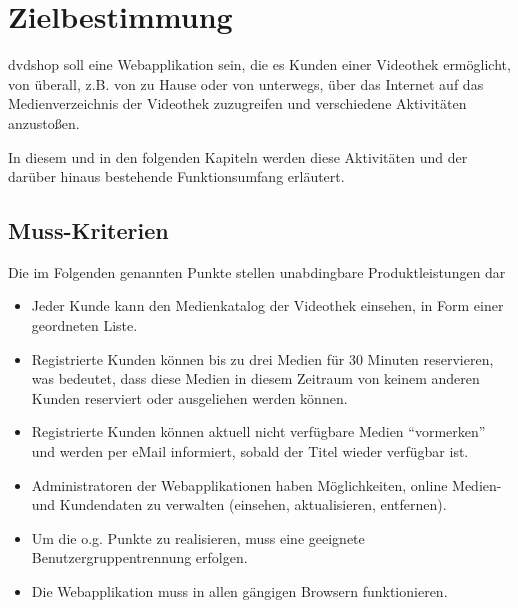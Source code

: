 \documentclass[12pt,oneside,a4paper,bibtotoc,liststotoc,pointlessnumbers]{scrartcl}
\begin{document}
\newpage

\setcounter{page}{1}


\section{Zielbestimmung}
dvdshop soll eine Webapplikation sein, die es Kunden einer Videothek ermöglicht, von überall, z.B. von zu Hause oder von unterwegs, über das Internet auf das Medienverzeichnis der Videothek zuzugreifen und verschiedene Aktivitäten anzustoßen.\par
In diesem und in den folgenden Kapiteln werden diese Aktivitäten und der  darüber hinaus bestehende Funktionsumfang erläutert.
\subsection{Muss-Kriterien}
Die im Folgenden genannten Punkte stellen unabdingbare Produktleistungen dar
\begin{itemize}
\item Jeder Kunde kann den Medienkatalog der Videothek einsehen, in Form einer geordneten Liste.
\item Registrierte Kunden können bis zu drei Medien für 30 Minuten reservieren, was bedeutet, dass diese Medien in diesem Zeitraum von keinem anderen Kunden reserviert oder ausgeliehen werden können.
\item Registrierte Kunden können aktuell nicht verfügbare Medien \enquote{vormerken} und werden per eMail informiert, sobald der Titel wieder verfügbar ist.
\item Administratoren der Webapplikationen haben Möglichkeiten, online Medien- und Kundendaten zu verwalten (einsehen, aktualisieren, entfernen).
\item Um die o.g. Punkte zu realisieren, muss eine geeignete Benutzergruppentrennung erfolgen. 
\item Die Webapplikation muss in allen gängigen Browsern funktionieren.
\end{itemize}
\end{document}
